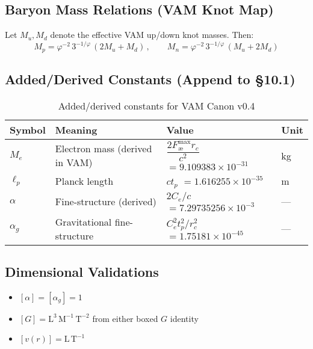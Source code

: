 \documentclass[11pt]{article}
\begin{document}
    \subsection{Baryon Mass Relations (VAM Knot Map)}
    Let $M_u, M_d$ denote the effective VAM up/down knot masses. Then:
    \[
        \boxed{M_p = \varphi^{-2}\,3^{-1/\varphi}\,(2 M_u + M_d)}\,,\qquad
        \boxed{M_n = \varphi^{-2}\,3^{-1/\varphi}\,(M_u + 2 M_d)}
    \]

    \subsection{Added/Derived Constants (Append to \S10.1)}
    \begin{table}[h!]
        \centering
        \begin{tabular}{|l|l|l|l|}
            \hline
            \textbf{Symbol} & \textbf{Meaning} & \textbf{Value} & \textbf{Unit} \\
            \hline
            $M_e$ & Electron mass (derived in VAM) & $\dfrac{2 F_{\text{\ae}}^{\max} r_c}{c^2}$ $= 9.109383\times10^{-31}$ & kg \\
            $\ell_p$ & Planck length & $c t_p$ $= 1.616255\times10^{-35}$ & m \\
            $\alpha$ & Fine-structure (derived) & $2C_e/c$ $= 7.29735256\times10^{-3}$ & --- \\
            $\alpha_g$ & Gravitational fine-structure & $C_e^{2} t_p^{2}/r_c^{2}$ $= 1.75181\times10^{-45}$ & --- \\
            \hline
        \end{tabular}
        \caption{Added/derived constants for VAM Canon v0.4}
        \label{tab:added-derived-constants}
    \end{table}

    \subsection{Dimensional Validations}
    \begin{itemize}
        \item $[\alpha]=[\alpha_g]=1$
        \item $[G]=\mathrm{L}^3\,\mathrm{M}^{-1}\,\mathrm{T}^{-2}$ from either boxed $G$ identity
        \item $[v(r)]=\mathrm{L}\,\mathrm{T}^{-1}$
    \end{itemize}
\end{document}
